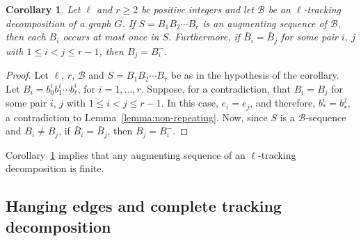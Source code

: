 \documentclass[12pt,reqno,a4paper]{amsart}
\newcommand{\azul}[1]{\textcolor{blue}{#1}}
\newtheorem{corollary}[theorem]{Corollary}
\newcommand{\B}{\mathcal{B}}
\begin{document}

\begin{corollary}\label{cor:augmenting-sequence-repeating-element}
  Let \(\ell\)
  and $r\geq 2$ be positive integers and let \(\B\)
  be an \(\ell\)-tracking
  decomposition of a graph \(G\).
  If \(S = B_1B_2\cdots B_r\)
  is an augmenting sequence of $\B$, then each \(B_i\)
  occurs at most once in \(S\).
  Furthermore, if $\bar B_i = \bar B_j$ for some pair $i$, $j$ with
  \(1\leq i<j \leq r-1\), then \(B_j = B_i^-\).
\end{corollary}

\begin{proof}
Let \(\ell\), $r$, \(\B\) and \(S = B_1B_2\cdots B_r\)  be as in the
hypothesis of the corollary. Let $B_i=b^i_0 b^i_1\cdots b^i_\ell$, for $i=1,\ldots,r$.
Suppose, for a contradiction,  that \(B_i = B_j\) for some pair $i$,
$j$ with  \(1\leq i<j\leq r-1\). In this case, $e_i=e_j$, and
therefore, \(b^i_{*} = b^j_{*}\), a contradiction to Lemma~\ref{lemma:non-repeating}.
Now, since \(S\) is a \(\B\)-sequence
and \(B_i\neq B_j\), if \(\bar B_i = \bar B_j\), then \(B_j = B_i^-\).
\end{proof}


Corollary~\ref{cor:augmenting-sequence-repeating-element} implies that any augmenting sequence of an $\ell$-tracking 
decomposition is finite. 


\subsection{Hanging edges and complete tracking decomposition}
\end{document}
